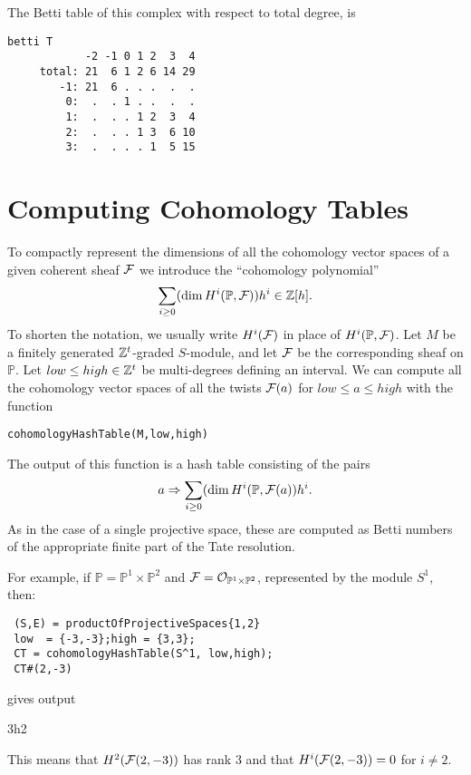 \documentclass[twoside,12pt, leqno]{amsart}
\def\PP{{\mathbb P}}
\begin{document}
The Betti table of this complex with respect to total degree, is
\goodbreak
{\small \begin{verbatim}
betti T
            -2 -1 0 1 2  3  4
     total: 21  6 1 2 6 14 29
        -1: 21  6 . . .  .  .
         0:  .  . 1 . .  .  .
         1:  .  . . 1 2  3  4
         2:  .  . . 1 3  6 10
         3:  .  . . . 1  5 15
\end{verbatim}}
\noindent

\section{Computing Cohomology Tables}\label{sec:cohom tables}
To compactly represent the dimensions of all the cohomology vector spaces of a given coherent sheaf ${\mathcal F}$ we introduce the ``cohomology polynomial''
$$
\sum_{i\geq 0} (\dim H^i(\PP, \sF))h^i\in \ZZ[h].
$$
To shorten the notation, we usually write $H^i({\mathcal F})$ in place of $H^i(\PP, \sF)$.
Let $M$ be a finitely generated ${\mathbb Z}^t$-graded $S$-module, and let ${\mathcal F}$ be the 
corresponding sheaf on $\PP$. Let
$low\leq high\in {\mathbb Z}^t$ be multi-degrees defining an interval. We can compute
all the cohomology vector spaces of all the twists ${\mathcal F}(a)$ for $low\leq a\leq high$ with the function 
{\small \begin{verbatim}
cohomologyHashTable(M,low,high)
\end{verbatim}}
The output of this function is a hash table consisting of the pairs
$$ 
a \Rightarrow \sum_{i\geq 0} (\dim H^i(\PP, \sF(a))h^i.
$$
As in the case of a single projective space, these are computed as Betti numbers of the appropriate finite  part of the Tate resolution.

For example,  if $\PP=\PP^1\times \PP^2$ and   $\sF = \sO_{\PP^1\times \PP^2}$, represented by the module
$S^1$, then:
{\small \begin{verbatim}
 (S,E) = productOfProjectiveSpaces{1,2}
 low  = {-3,-3};high = {3,3};
 CT = cohomologyHashTable(S^1, low,high);
 CT#(2,-3)
\end{verbatim}}
gives output
\begin{verb}
3h2 
\end{verb}
This means that $H^2({\mathcal F}(2,-3))$ has rank $3$ and that $H^i({\mathcal F}(2,-3)) = 0$ for $i\ne 2$.
\end{document}

